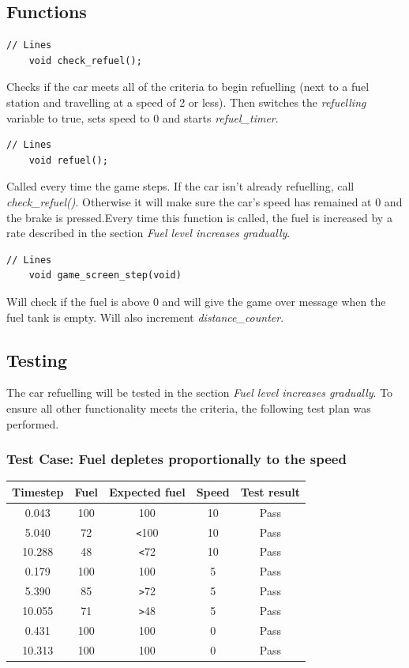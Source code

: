 \documentclass{article}
\begin{document}
\subsection*{Functions}
\begin{lstlisting}[style=CStyle]
	// Lines 
	void check_refuel();
\end{lstlisting}
Checks if the car meets all of the criteria to begin refuelling (next to a fuel station and travelling at a speed of 2 or less). Then switches the \emph{refuelling} variable to true, sets speed to 0 and starts \emph{refuel\_timer}.
\begin{lstlisting}[style=CStyle]
	// Lines 
	void refuel();
\end{lstlisting}
Called every time the game steps. If the car isn't already refuelling, call \emph{check\_refuel()}. Otherwise it will make sure the car's speed has remained at 0 and the brake is pressed.Every time this function is called, the fuel is increased by a rate described in the section \emph{Fuel level increases gradually}.
\begin{lstlisting}[style=CStyle]
	// Lines 
	void game_screen_step(void)
\end{lstlisting}
Will check if the fuel is above 0 and will give the game over message when the fuel tank is empty. Will also increment \emph{distance\_counter}.
\newpage

\subsection*{Testing}
The car refuelling will be tested in the section \emph{Fuel level increases gradually}. To ensure all other functionality meets the criteria, the following test plan was performed.

\subsubsection*{Test Case: Fuel depletes proportionally to the speed}
\begin{center}
\begin{tabular}{ c c c c c }
Timestep	& Fuel		& Expected fuel	& Speed	& Test result		\\ \hline
0.043		& 100		& 100			& 10		& Pass		\\
5.040		& 72		& \verb|<|100	& 10		& Pass		\\
10.288	& 48		& \verb|<|72	& 10		& Pass		\\
0.179		& 100		& 100			& 5		& Pass		\\
5.390		& 85		& \verb|>|72	& 5		& Pass		\\
10.055	& 71		& \verb|>|48	& 5		& Pass		\\
0.431		& 100		& 100			& 0		& Pass		\\
10.313	& 100		& 100			& 0		& Pass		\\ \hline
\end{tabular}
\end{center}
\end{document}
